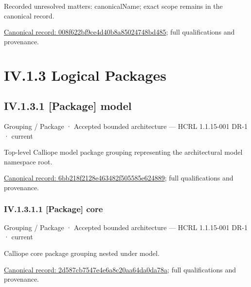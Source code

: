 {\small Recorded unresolved matters: canonicalName; exact scope remains in the canonical record.}\par
{\footnotesize \href{../../../../continuum/application/data-object/008f622bf9ce4d40b8a85024748bd485.md}{Canonical record: 008f622bf9ce4d40b8a85024748bd485}; full qualifications and provenance.}\par
\section*{IV.1.3 Logical Packages}
\label{navigation:IV.1.3}

\subsection*{IV.1.3.1 [Package] model}
\label{navigation:IV.1.3.1}

\label{element:6bb218f2128e463482f505585e624889}
{\small Grouping / Package · Accepted bounded architecture — HCRL 1.1.15-001 DR-1 · current}\par

Top-level Calliope model package grouping representing the architectural model namespace root.


{\footnotesize \href{../../../../continuum/grouping/package/6bb218f2128e463482f505585e624889.md}{Canonical record: 6bb218f2128e463482f505585e624889}; full qualifications and provenance.}\par
\subsubsection*{IV.1.3.1.1 [Package] core}
\label{navigation:IV.1.3.1.1}

\label{element:2d587cb7547e4e6a8c20aa64da0da78a}
{\small Grouping / Package · Accepted bounded architecture — HCRL 1.1.15-001 DR-1 · current}\par

Calliope core package grouping nested under model.


{\footnotesize \href{../../../../continuum/grouping/package/2d587cb7547e4e6a8c20aa64da0da78a.md}{Canonical record: 2d587cb7547e4e6a8c20aa64da0da78a}; full qualifications and provenance.}\par
